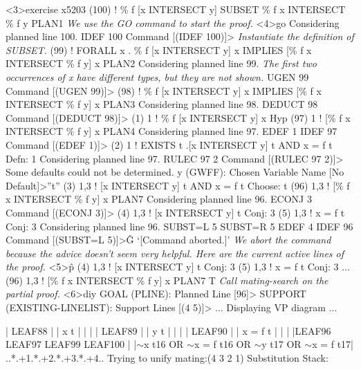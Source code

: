\begin{tpsexample}
<3>exercise x5203
(100)        !  \% f [x INTERSECT y] SUBSET \% f x INTERSECT \% f y           PLAN1
{\it We use the GO command to start the proof.}
<4>go
Considering planned line 100.
  IDEF 100
Command [(IDEF 100)]>
{\it Instantiate the definition of SUBSET.}
(99)         !  FORALL x .        \% f [x INTERSECT y] x
                           IMPLIES [\% f x INTERSECT \% f y] x               PLAN2
Considering planned line 99.
{\it The first two occurrences of x have different types, but they are not shown.}
  UGEN 99
Command [(UGEN 99)]>
(98)         !  \% f [x INTERSECT y] x IMPLIES [\% f x INTERSECT \% f y] x    PLAN3
Considering planned line 98.
  DEDUCT 98
Command [(DEDUCT 98)]>
(1)   1      !  \% f [x INTERSECT y] x                                        Hyp
(97)  1      !  [\% f x INTERSECT \% f y] x                                  PLAN4
Considering planned line 97.
  EDEF 1
  IDEF 97
Command [(EDEF 1)]>
(2)   1      !  EXISTS t .[x INTERSECT y] t AND x = f t                  Defn: 1
Considering planned line 97.
  RULEC 97 2
Command [(RULEC 97 2)]>
Some defaults could not be determined.
y (GWFF): Chosen Variable Name [No Default]>''t''
(3)   1,3    !  [x INTERSECT y] t AND x = f t                          Choose: t
(96)  1,3    !  [\% f x INTERSECT \% f y] x                                  PLAN7
Considering planned line 96.
  ECONJ 3
Command [(ECONJ 3)]>
(4)   1,3    !  [x INTERSECT y] t                                        Conj: 3
(5)   1,3    !  x = f t                                                  Conj: 3
Considering planned line 96.
  SUBST=L 5
  SUBST=R 5
  EDEF 4
  IDEF 96
Command [(SUBST=L 5)]>\^G
`[Command aborted.]'
{\it We abort the command because the advice doesn't seem very helpful.
Here are the current active lines of the proof.}
<5>\^p
(4)   1,3    !  [x INTERSECT y] t                                        Conj: 3
(5)   1,3    !  x = f t                                                  Conj: 3
               ...
(96)  1,3    !  [\% f x INTERSECT \% f y] x                                  PLAN7
T
{\it Call mating-search on the partial proof.}
<6>diy
GOAL (PLINE): Planned Line [96]>
SUPPORT (EXISTING-LINELIST): Support Lines [(4 5)]>
...
Displaying VP diagram ...

|                   LEAF88                   |
|                    x t                     |
|                                            |
|                   LEAF89                   |
|                    y t                     |
|                                            |
|                  LEAF90                    |
|                  x = f t                   |
|                                            |
|LEAF96      LEAF97      LEAF99     LEAF100  |
|\(\sim\)x t16 OR \(\sim\)x = f t16 OR \(\sim\)y t17 OR \(\sim\)x = f t17|
..*.+1.*.+2.*.+3.*.+4..
Trying to unify mating:(4 3 2 1)
Substitution Stack:


\end{tpsexample}
